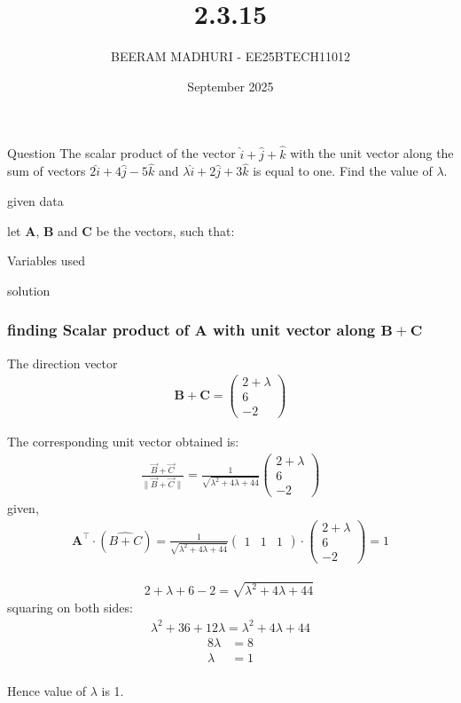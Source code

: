 \documentclass{beamer}
\title %
{2.3.15}
\date{September  2025}
\author %
{BEERAM MADHURI - EE25BTECH11012}
\begin{document}
\frame{\titlepage}
\begin{frame}{Question}
The scalar product of the vector $\hat{i}+\hat{j}+\hat{k}$ with the unit vector along the sum of vectors $2\hat{i} + 4\hat{j} - 5\hat{k}$ and $\lambda \hat{i} + 2\hat{j} + 3\hat{k}$ is equal to one. Find the value of $\lambda$.
 
\end{frame}
 
\begin{frame}{given data}
 
\text let $\mathbf{A}$, $\mathbf{B}$ and $\mathbf{C}$ be the vectors, such that:
\begin{table}[h!]
    \centering
    
    \caption{Variables used}
    \label{table 2.3.15}
\end{table}


   
\end{frame}
 
\begin{frame}{solution}
    \frametitle{finding Scalar product of $\mathbf{A}$ with unit vector along  $\mathbf{B}+\mathbf{C}$}
The direction vector
\begin{align}\mathbf{B}+\mathbf{C} = \begin{pmatrix} 2+\lambda \\ 6 \\ -2 \end{pmatrix}
\end{align}

The corresponding unit vector obtained is:
\begin{align}
\frac{\vec{B} + \vec{C}}{\|\vec{B} + \vec{C}\|} =
\frac{1}{\sqrt{\lambda^2 + 4\lambda + 44}} \begin{pmatrix} 2+\lambda \\ 6 \\ -2 \end{pmatrix} 
\end{align}
given,
\begin{align}
 \mathbf{A^\top} \cdot (\hat{B+C}) = 
\frac{1}{\sqrt{\lambda^2 + 4\lambda + 44}} \begin{pmatrix}1 & 1 & 1 \end{pmatrix} \cdot \begin{pmatrix} 2+\lambda \\ 6 \\ -2 \end{pmatrix} =1
\end{align}
\end{frame}
\begin{frame}
\begin{align}2 + \lambda + 6 - 2 = \sqrt{\lambda^2 + 4\lambda + 44} \
\end{align}
squaring on both sides:
\begin{align}\lambda^2 + 36 + 12\lambda = \lambda^2 + 4\lambda + 44  
\end{align}
\begin{align}8\lambda &= 8 \\\lambda &= 1\end{align}\\
Hence value of $\lambda$ is 1.
\end{frame}
\end{document}
